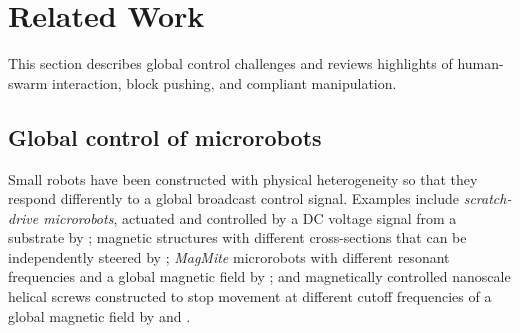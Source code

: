 

\section{Related Work}\label{sec:RelatedWork}
This section describes global control challenges and reviews highlights of human-swarm interaction, block pushing, and compliant manipulation.


\subsection{Global control of microrobots}
Small robots have been constructed with physical heterogeneity so that they respond differently to a global broadcast control signal.  Examples include \emph{scratch-drive microrobots}, actuated and controlled by a DC voltage signal from a substrate by \cite{Donald2006,Donald2008};   magnetic structures  with different cross-sections that can be independently steered by \cite{Floyd2011,Diller2013};   \emph{MagMite} microrobots with different resonant frequencies and a global magnetic field by \cite{Frutiger2008}; and  magnetically controlled nanoscale helical screws constructed to stop movement at different cutoff frequencies of a global magnetic field by
\cite{Tottori2012} and \cite{Peyer2013}. 





